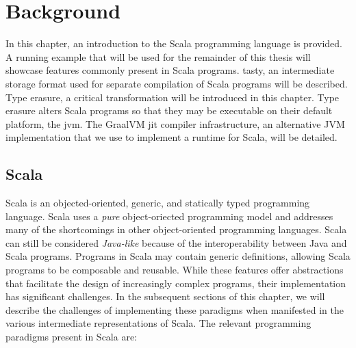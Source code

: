 \chapter{Background}

In this chapter,  an introduction to the Scala programming language is provided. 
A running example that will be used for the remainder of this thesis will showcase features commonly present in Scala programs. 
\acrfull{tasty}, an intermediate storage format used for separate compilation of Scala programs will be described. 
Type erasure, a critical transformation will be introduced in this chapter. 
Type erasure alters Scala programs so that they may be executable on their default platform, the \acrfull{jvm}. 
The GraalVM \acrfull{jit} compiler infrastructure, an alternative JVM implementation that we use to implement a runtime for Scala, will be detailed.

\section{Scala}

Scala\cite{scala:overview} is an objected-oriented, generic, and statically typed programming language.
Scala uses a \textit{pure} object-oriected programming model\cite{smalltalk:design} and addresses many of the shortcomings\cite{go4:design-patterns} in other object-oriented programming languages.
Scala can still be considered \textit{Java-like} because of the interoperability between Java and Scala programs.
Programs in Scala may contain generic definitions, allowing Scala programs to be composable and reusable\cite{scala:origins}.
While these features offer abstractions that facilitate the design of increasingly complex programs, their implementation has significant challenges.
In the subsequent sections of this chapter, we will describe the challenges of implementing these paradigms when manifested in the various intermediate representations of Scala.
The relevant programming paradigms present in Scala are:

